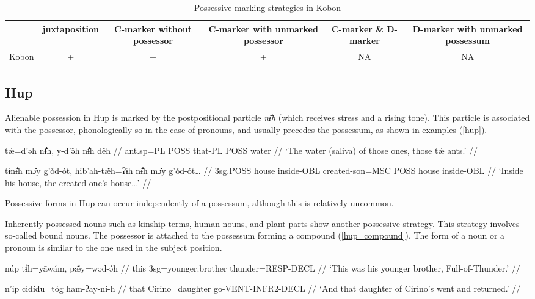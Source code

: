 \begin{table}[h!]
	\centering
	\small
	\begin{tabular}{@{}cccccc@{}}
		\toprule
		& juxtaposition & \parbox{2.5cm}{C-marker without possessor} & \parbox{2.75cm}{C-marker with unmarked possessor} & \parbox{1.75cm}{C-marker \& D-marker} & \parbox{3cm}{D-marker with unmarked possessum} \\ \midrule
		Kobon & + & + & + & NA & NA \\ \bottomrule
	\end{tabular}
	\caption{Possessive marking strategies in Kobon}
\end{table}


\subsection{Hup}

Alienable possession in Hup is marked by the postpositional particle \textit{nɨ̐h} (which receives stress and a rising tone). This particle is associated with the possessor, phonologically so in the case of pronouns, and usually precedes the possessum, as shown in examples (\ref{hup}).

\pex\label{hup}
\a
\begingl
\gla tǽ=d’əh nɨ̐h, y-d’ə̌h nɨ̐h děh //
\glb ant.sp=PL POSS that-PL POSS water //
\glft `The water (saliva) of those ones, those tǽ ants.' //
\endgl

\a
\begingl
\gla tɨnɨ̐h mɔ̌y g’ǒd-ót, hib’ah-tæ̃h=ʔɨh nɨ̐h mɔ̌y g’ǒd-ót… //
\glb 3sg.POSS house inside-OBL created-son=MSC POSS house inside-OBL //
\glft `Inside his house, the created one’s house…' //
\endgl
\xe

Possessive forms in Hup can occur independently of a possessum, although this is relatively uncommon.

Inherently possessed nouns such as kinship terms, human nouns, and plant parts show another possessive strategy. This strategy involves so-called bound nouns. The possessor is attached to the possessum forming a compound (\ref{hup_compound}). The form of a noun or a pronoun is similar to the one used in the subject position.

\pex\label{hup_compound}
\a
\begingl
\gla núp tɨ́h=yãwám, pæ̃́y=wəd-ə́h //
\glb this 3sg=younger.brother thunder=RESP-DECL //
\glft ‘This was his younger brother, Full-of-Thunder.’ //
\endgl

\a
\begingl
\gla n’ip cidídu=tóg ham-ʔay-ní-h //
\glb that Cirino=daughter go-VENT-INFR2-DECL //
\glft ‘And that daughter of Cirino’s went and returned.’ //
\endgl
\xe

